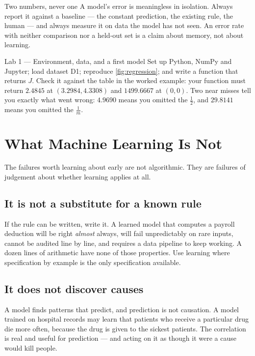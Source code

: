 \begin{keyinsight}{Two numbers, never one}
A model's error is meaningless in isolation. Always report it against a baseline
--- the constant prediction, the existing rule, the human --- and always measure
it on data the model has not seen. An error rate with neither comparison nor a
held-out set is a claim about memory, not about learning.
\end{keyinsight}

\begin{labbox}{Lab 1 --- Environment, data, and a first model}
Set up Python, NumPy and Jupyter; load dataset D1; reproduce
\cref{fig:regression}; and write a function  that returns
$J$. Check it against the table in the worked example: your function must return
$2.4845$ at $(3.2984, 4.3308)$ and $1499.6667$ at $(0,0)$. Two near misses tell
you exactly what went wrong: $4.9690$ means you omitted the $\tfrac12$, and
$29.8141$ means you omitted the $\tfrac{1}{m}$.
\end{labbox}

\section{What Machine Learning Is Not}
\label{sec:what-its-not}

The failures worth learning about early are not algorithmic. They are failures of
judgement about whether learning applies at all.

\subsection{It is not a substitute for a known rule}

If the rule can be written, write it. A learned model that computes a payroll
deduction will be right \emph{almost} always, will fail unpredictably on rare
inputs, cannot be audited line by line, and requires a data pipeline to keep
working. A dozen lines of arithmetic have none of those properties. Use learning
where specification by example is the only specification available.

\subsection{It does not discover causes}

A model finds patterns that predict, and prediction is not causation. A model
trained on hospital records may learn that patients who receive a particular
drug die more often, because the drug is given to the sickest patients. The
correlation is real and useful for prediction --- and acting on it as though it
were a cause would kill people.

